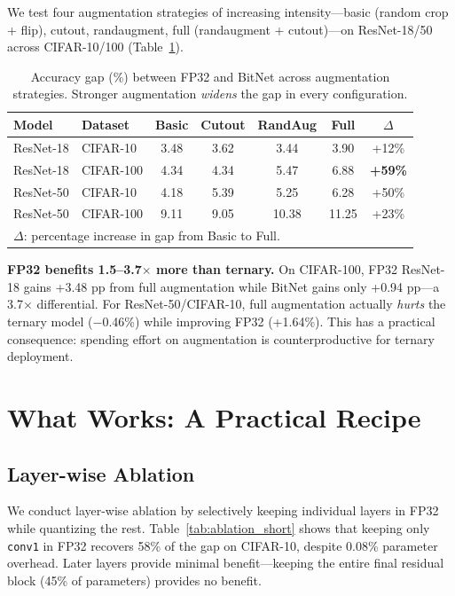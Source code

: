 \documentclass[10pt]{article}
\begin{document}
We test four augmentation strategies of increasing intensity---basic (random crop + flip), cutout, randaugment, full (randaugment + cutout)---on ResNet-18/50 across CIFAR-10/100 (Table~\ref{tab:augmentation_short}).

\begin{table}[ht]
\centering
\caption{Accuracy gap (\%) between FP32 and BitNet across augmentation strategies. Stronger augmentation \emph{widens} the gap in every configuration.}
\label{tab:augmentation_short}
\small
\begin{tabular}{llccccc}
\toprule
Model & Dataset & Basic & Cutout & RandAug & Full & $\Delta$ \\
\midrule
ResNet-18 & CIFAR-10  & 3.48 & 3.62 & 3.44 & 3.90 & +12\% \\
ResNet-18 & CIFAR-100 & 4.34 & 4.34 & 5.47 & 6.88 & \textbf{+59\%} \\
ResNet-50 & CIFAR-10  & 4.18 & 5.39 & 5.25 & 6.28 & +50\% \\
ResNet-50 & CIFAR-100 & 9.11 & 9.05 & 10.38 & 11.25 & +23\% \\
\bottomrule
\multicolumn{7}{l}{\footnotesize $\Delta$: percentage increase in gap from Basic to Full.}
\end{tabular}
\end{table}

\textbf{FP32 benefits 1.5--3.7$\times$ more than ternary.} On CIFAR-100, FP32 ResNet-18 gains +3.48 pp from full augmentation while BitNet gains only +0.94 pp---a 3.7$\times$ differential. For ResNet-50/CIFAR-10, full augmentation actually \emph{hurts} the ternary model ($-$0.46\%) while improving FP32 (+1.64\%). This has a practical consequence: spending effort on augmentation is counterproductive for ternary deployment.

\section{What Works: A Practical Recipe}

\subsection{Layer-wise Ablation}

We conduct layer-wise ablation by selectively keeping individual layers in FP32 while quantizing the rest. Table~\ref{tab:ablation_short} shows that keeping only \texttt{conv1} in FP32 recovers 58\% of the gap on CIFAR-10, despite 0.08\% parameter overhead. Later layers provide minimal benefit---keeping the entire final residual block (45\% of parameters) provides no benefit.
\end{document}
